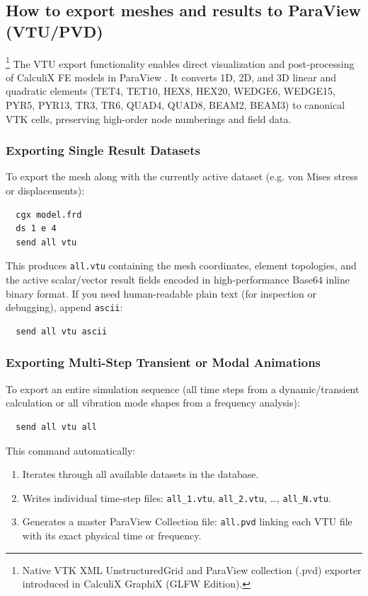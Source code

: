 \documentclass{article}
\begin{document}
\begin{appendix}
\subsection{\label{How to export results to ParaView}How to export meshes and results to ParaView (VTU/PVD)}
\footnote{Native VTK XML UnstructuredGrid and ParaView collection (.pvd) exporter introduced in CalculiX GraphiX (GLFW Edition).}
The VTU export functionality enables direct visualization and post-processing of CalculiX FE models in ParaView \cite{paraview}. It converts 1D, 2D, and 3D linear and quadratic elements (TET4, TET10, HEX8, HEX20, WEDGE6, WEDGE15, PYR5, PYR13, TR3, TR6, QUAD4, QUAD8, BEAM2, BEAM3) to canonical VTK cells, preserving high-order node numberings and field data.

\subsubsection{Exporting Single Result Datasets}
To export the mesh along with the currently active dataset (e.g. von Mises stress or displacements):
\begin{verbatim}
  cgx model.frd
  ds 1 e 4
  send all vtu
\end{verbatim}
This produces \texttt{all.vtu} containing the mesh coordinates, element topologies, and the active scalar/vector result fields encoded in high-performance Base64 inline binary format. If you need human-readable plain text (for inspection or debugging), append \texttt{ascii}:
\begin{verbatim}
  send all vtu ascii
\end{verbatim}

\subsubsection{Exporting Multi-Step Transient or Modal Animations}
To export an entire simulation sequence (all time steps from a dynamic/transient calculation or all vibration mode shapes from a frequency analysis):
\begin{verbatim}
  send all vtu all
\end{verbatim}
This command automatically:
\begin{enumerate}
\item Iterates through all available datasets in the database.
\item Writes individual time-step files: \texttt{all\_1.vtu}, \texttt{all\_2.vtu}, \dots, \texttt{all\_N.vtu}.
\item Generates a master ParaView Collection file: \texttt{all.pvd} linking each VTU file with its exact physical time or frequency.
\end{enumerate}


\end{appendix}
\end{document}
